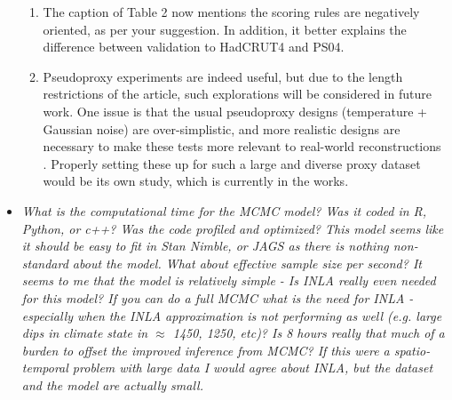 \documentclass[11pt]{article}
\newcommand{\bl}[1]{\color{red}\textbf{[Bo: #1]}\normalcolor}
\newcommand{\jeg}[1]{\color{blue}\textbf{Julien: #1]}\normalcolor}
\begin{document}
\begin{itemize}
\begin{enumerate}
\item The caption of Table 2 now mentions the scoring rules
are negatively oriented, as per your suggestion. In addition, it better explains the difference between validation to HadCRUT4 and PS04. 

\item Pseudoproxy experiments are indeed useful, but due to the length restrictions of the article, such explorations will be considered in future work. One issue is that the usual pseudoproxy designs (temperature + Gaussian noise) are over-simplistic, and more realistic designs are necessary to make these tests more relevant to real-world reconstructions \citep{Evans_grl2014}. Properly setting these up for such a large and diverse proxy dataset would be its own study, which is currently in the works. 

\end{enumerate}



 




\item \textit{What is the computational time for the MCMC model? Was it coded in
    R, Python, or c++? Was the code profiled and optimized? This model seems
    like it should be easy to fit in Stan Nimble, or JAGS as there is nothing non-standard about the model. What about effective sample size per second? It seems
to me that the model is relatively simple - Is INLA really even needed for this
model? If you can do a full MCMC what is the need for INLA - especially when the
INLA approximation is not performing as well (e.g. large dips in climate state
in $\approx$ 1450, 1250, etc)? Is 8 hours really that much of a burden to offset
the improved
inference from MCMC? If this were a spatio-temporal problem with large data I
would agree about INLA, but the dataset and the model are actually small.
}


\end{itemize}
\end{document}
